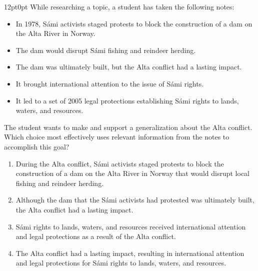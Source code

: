 \documentclass[11pt, twocolumn]{article}
\newcounter{questionnum}
\begin{document}
\vspace{6pt}\noindent
\begin{minipage}{\columnwidth}\raggedright
\noindent{}\par\vspace{8pt}
\begin{adjustwidth}{12pt}{0pt}
While researching a topic, a student has taken the following notes:

\begin{itemize}

\item In 1978, Sámi activists staged protests to block the construction of a dam on the Alta River in Norway.

\item The dam would disrupt Sámi fishing and reindeer herding.

\item The dam was ultimately built, but the Alta conflict had a lasting impact.

\item It brought international attention to the issue of Sámi rights.

\item It led to a set of 2005 legal protections establishing Sámi rights to lands, waters, and resources.

\end{itemize}
\vspace{6pt}

The student wants to make and support a generalization about the Alta conflict. Which choice most effectively uses relevant information from the notes to accomplish this goal?
\begin{enumerate}[label=\Alph*),leftmargin=18pt,topsep=3pt,itemsep=2pt]
  \item During the Alta conflict, Sámi activists staged protests to block the construction of a dam on the Alta River in Norway that would disrupt local fishing and reindeer herding.
  \item Although the dam that the Sámi activists had protested was ultimately built, the Alta conflict had a lasting impact.
  \item Sámi rights to lands, waters, and resources received international attention and legal protections as a result of the Alta conflict.
  \item The Alta conflict had a lasting impact, resulting in international attention and legal protections for Sámi rights to lands, waters, and resources.
\end{enumerate}
\end{adjustwidth}
\end{minipage}\par
\end{document}
